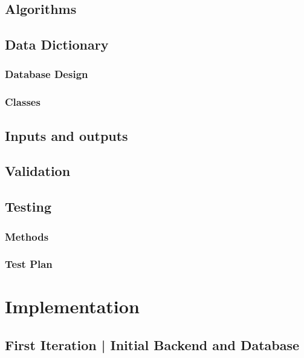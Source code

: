 \documentclass[11pt,a4paper]{article}
\begin{document}
\pagebreak
\subsection{Algorithms}


\pagebreak
\subsection{Data Dictionary}

\subsubsection{Database Design}


\pagebreak
\subsubsection{Classes}


\subsection{Inputs and outputs}

\subsection{Validation}

\subsection{Testing}

\subsubsection{Methods}

\subsubsection{Test Plan}

\pagebreak

\section{Implementation}

\subsection{First Iteration | Initial Backend and Database}

\end{document}
